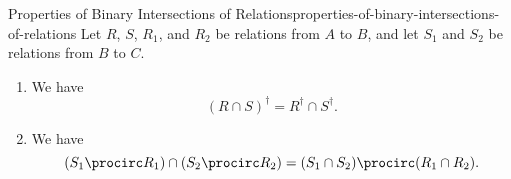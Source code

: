 \begin{proposition}{Properties of Binary Intersections of Relations}{properties-of-binary-intersections-of-relations}%
    Let $R$, $S$, $R_{1}$, and $R_{2}$ be relations from $A$ to $B$, and let $S_{1}$ and $S_{2}$ be relations from $B$ to $C$.
    \begin{enumerate}
        \item\label{properties-of-binary-intersections-of-relations-interaction-with-inverses}We have
            \[
                (R\cap S)^{\dagger}
                =
                R^{\dagger}\cap S^{\dagger}.
            \]%
        \item\label{properties-of-binary-intersections-of-relations-interaction-with-composition}We have
            \[
                (S_{1}\procirc R_{1})
                \cap
                (S_{2}\procirc R_{2})
                =
                (S_{1}\cap S_{2})
                \procirc
                (R_{1}\cap R_{2}).
            \]%
    \end{enumerate}
\end{proposition}
